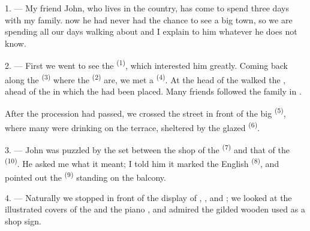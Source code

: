 
\VUsaut{4.0mm}
\VUsaut{3.0mm}

\VUsaut{3.0mm}

1. --- My friend John, who lives in the country, has come to spend three
days with my family.  now he had never had the chance to see a
big town, so we are spending all our days walking about and I explain to
him whatever he does not know.

2. --- First we went to see the  \textsuperscript{(1)}, which
interested him greatly. Coming back along the  \textsuperscript{(3)}
where the  \textsuperscript{(2)} are, we met a 
\textsuperscript{(4)}. At the head of the  walked the
, ahead of the  in which the  had
been placed. Many friends followed the family in .

After the procession had passed, we crossed the street in front of the
big  \textsuperscript{(5)}, where many  were
drinking  on the terrace, sheltered by the glazed
 \textsuperscript{(6)}.

3. --- John was puzzled by the  set between the shop of
the  \textsuperscript{(7)} and that of the
 \textsuperscript{(10)}. He asked me what it meant; I told him it
marked the English  \textsuperscript{(8)}, and pointed out the
 \textsuperscript{(9)} standing on the balcony.

\VUsaut{3.0mm}

4. --- Naturally we stopped in front of the display of
, ,  and
; we looked at the illustrated covers of the 
and the piano , and admired the gilded wooden  used
as a shop sign.

